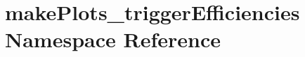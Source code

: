 \hypertarget{namespacemakePlots__triggerEfficiencies}{
\section{makePlots\_\-triggerEfficiencies Namespace Reference}
\label{namespacemakePlots__triggerEfficiencies}
}
